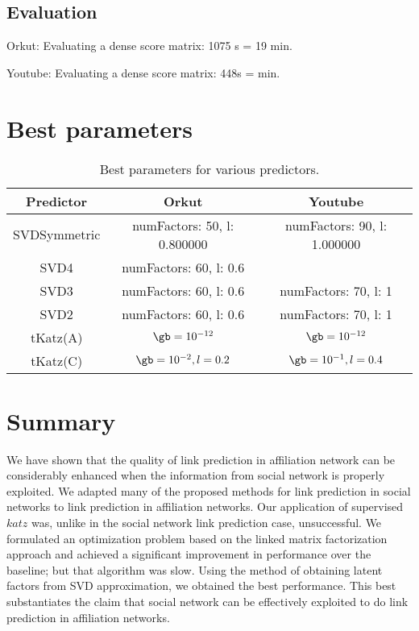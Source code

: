\documentclass{report}
\begin{document}
\subsection{Evaluation}
Orkut: 
Evaluating a dense score matrix: 1075 s = 19 min.

Youtube:
Evaluating a dense score matrix: 448s = min.


\section{Best parameters}

\begin{table*}
\centering
\begin{tabular}{| c | c | c |} \hline
Predictor&Orkut&Youtube\\ \hline
SVDSymmetric & numFactors: 50, l: 0.800000 & numFactors: 90, l: 1.000000 \\ \hline
SVD4 & numFactors: 60, l: 0.6 & \\ \hline
SVD3 & numFactors: 60, l: 0.6 & numFactors: 70, l: 1 \\ \hline
SVD2 & numFactors: 60, l: 0.6 & numFactors: 70, l: 1 \\ \hline
tKatz(A) & $\gb = 10^{-12}$ & $\gb = 10^{-12}$ \\ \hline
tKatz(C) & $\gb = 10^{-2}, l = 0.2$ & $\gb = 10^{-1}, l = 0.4$
 \\ \hline
\end{tabular}
\caption{Best parameters for various predictors.}
\end{table*}


\section{Summary}
We have shown that the quality of link prediction in affiliation network can be considerably enhanced when the information from social network is properly exploited. We adapted many of the proposed methods for link prediction in social networks to link prediction in affiliation networks. Our application of supervised $katz$ was, unlike in the social network link prediction case, unsuccessful. We formulated an optimization problem based on the linked matrix factorization approach and achieved a significant improvement in performance over the baseline; but that algorithm was slow. Using the method of obtaining latent factors from SVD approximation, we obtained the best performance. This best substantiates the claim that social network can be effectively exploited to do link prediction in affiliation networks.
\end{document}

